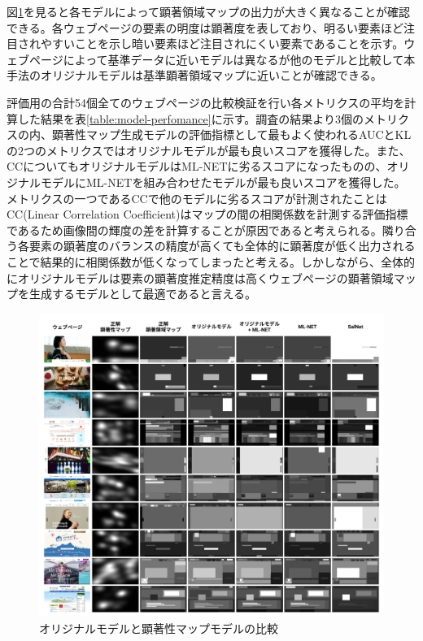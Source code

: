 \par 図\ref{fig_07_eval-models}を見ると各モデルによって顕著領域マップの出力が大きく異なることが確認できる。各ウェブページの要素の明度は顕著度を表しており、明るい要素ほど注目されやすいことを示し暗い要素ほど注目されにくい要素であることを示す。ウェブページによって基準データに近いモデルは異なるが他のモデルと比較して本手法のオリジナルモデルは基準顕著領域マップに近いことが確認できる。

\par 評価用の合計54個全てのウェブページの比較検証を行い各メトリクスの平均を計算した結果を表\ref{table:model-perfomance}に示す。調査の結果より3個のメトリクスの内、顕著性マップ生成モデルの評価指標として最もよく使われるAUCとKLの2つのメトリクスではオリジナルモデルが最も良いスコアを獲得した。また、CCについてもオリジナルモデルはML-NETに劣るスコアになったものの、オリジナルモデルにML-NETを組み合わせたモデルが最も良いスコアを獲得した。メトリクスの一つであるCCで他のモデルに劣るスコアが計測されたことはCC(Linear Correlation Coefficient)はマップの間の相関係数を計測する評価指標であるため画像間の輝度の差を計算することが原因であると考えられる。隣り合う各要素の顕著度のバランスの精度が高くても全体的に顕著度が低く出力されることで結果的に相関係数が低くなってしまったと考える。しかしながら、全体的にオリジナルモデルは要素の顕著度推定精度は高くウェブページの顕著領域マップを生成するモデルとして最適であると言える。


\begin{figure}[H]
  \centering
  \includegraphics[width=12.5cm]{figures/07_eval-models.jpg}
  \caption{オリジナルモデルと顕著性マップモデルの比較}
  \label{fig_07_eval-models}
\end{figure}

